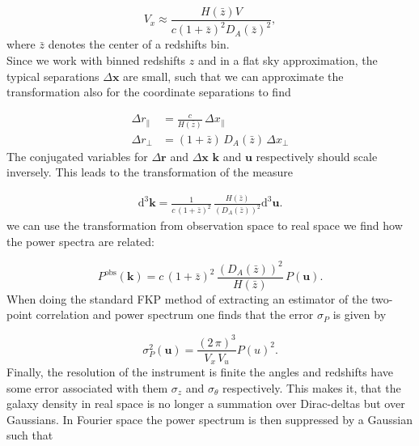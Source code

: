 \documentclass[oneside]{book}
\newcommand*{\rd}{\mathrm{d}}
\begin{document}
\begin{equation*}
    V_x \approx \frac{H(\bar{z}) V}{c (1+\bar{z})^2 D_A(\bar{z})^2},
\end{equation*}
where $\bar{z}$ denotes the center of a redshifts bin.\\
Since we work with binned redshifts $z$ and in a flat sky approximation, the typical separations $\Delta \boldsymbol{x}$ are small, such that we can approximate the transformation also for the coordinate  separations to find 

\begin{align}
    \Delta r_\|  &= \frac{c}{H(\bar{z})}\, \Delta x_\| \\
    \Delta r_\perp &= (1+\bar{z})\, D_A(\bar{z})\, \Delta x_\perp
\end{align}
 The conjugated variables for $\Delta\boldsymbol{ r}$ and $\Delta\boldsymbol{x}$ $\boldsymbol{k}$ and $\boldsymbol{u}$ respectively should scale inversely. This leads to the transformation of the measure
 
 \begin{align}
    \rd^3 \boldsymbol{k} = \frac{1}{c\,(1+\bar{z})^2} \, \frac{H(\bar{z})} {(D_A(\bar{z}))^2} \rd^3 \boldsymbol{u}.
 \end{align}
 we can use the transformation from observation space to real space we find how the power spectra are related:
 
 \begin{equation}
    \label{eq:transform_power}
    P^\mathrm{obs}(\boldsymbol{k}) = c\,(1+\bar{z})^2\, \frac{(D_A(\bar{z}))^2}{H(\bar{z})}\,P(\boldsymbol{u}).
 \end{equation}
 When doing the standard FKP method of extracting an estimator of the two-point correlation and power spectrum one finds that the error $\sigma_P$ is given by 
 
 \begin{equation}
    \sigma^2_P(\boldsymbol{u})  = \frac{(2\,\pi)^3}{V_x\, V_u} P(u)^2.
 \end{equation}
 Finally, the resolution of the instrument is finite the angles and redshifts have some error associated with them $\sigma_z$ and $\sigma_\theta$ respectively. This makes it, that the galaxy density in real space is no longer a summation over Dirac-deltas but over Gaussians. In Fourier space the power spectrum is then suppressed by a Gaussian such that
\end{document}
